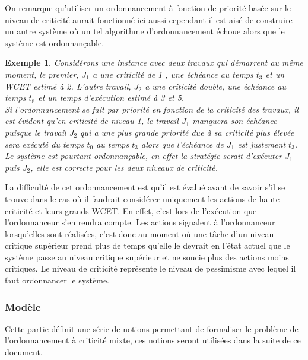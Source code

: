 \documentclass[12pt,a4paper,oneside]{book}
\theoremstyle{break}
\newtheorem{exem}{Exemple}[chapter]
\theoremstyle{breakplain}
\begin{document}
On remarque qu'utiliser un ordonnancement à fonction de priorité basée sur le niveau de criticité aurait fonctionné ici aussi cependant il est aisé de construire un autre système où un tel algorithme d'ordonnancement échoue alors que le système est ordonnançable.

\begin{exem}
Considérons une instance avec deux travaux qui démarrent au même moment, le premier, $J_1$ a une criticité de 1 , une échéance au temps $t_3$ et un WCET estimé à 2. L'autre travail, $J_2$ a une criticité double, une échéance au temps $t_8$ et un temps d'exécution estimé à 3 et 5.\\
Si l'ordonnancement se fait par priorité en fonction de la criticité des travaux, il est évident qu'en criticité de niveau 1, le travail $J_1$ manquera son échéance puisque le travail $J_2$ qui a une plus grande priorité due à sa criticité plus élevée sera exécuté du temps $t_0$ au temps $t_3$ alors que l'échéance de $J_1$ est justement $t_3$.\\
Le système est pourtant ordonnançable, en effet la stratégie serait d'exécuter $J_1$ puis $J_2$, elle est correcte pour les deux niveaux de criticité.
\end{exem}

La difficulté de cet ordonnancement est qu'il est évalué avant de savoir s'il se trouve dans le cas où il faudrait considérer uniquement les actions de haute criticité et leurs grands WCET. En effet, c'est lors de l'exécution que l'ordonnanceur s'en rendra compte. Les actions signalent à l'ordonnanceur lorsqu'elles sont réalisées, c'est donc au moment où une tâche d'un niveau critique supérieur prend plus de temps qu'elle le devrait en l'état actuel que le système passe au niveau critique supérieur et ne soucie plus des actions moins critiques. Le niveau de criticité représente le niveau de pessimisme avec lequel il faut ordonnancer le système. 

\subsubsection{Modèle}
Cette partie définit une série de notions permettant de formaliser le problème de l'ordonnancement à criticité mixte, ces notions seront utilisées dans la suite de ce document.
\end{document}
